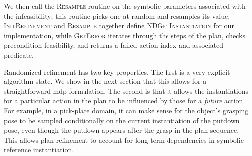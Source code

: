 We then call the \textsc{Resample} routine on the symbolic parameters
associated with the infeasibility; this routine picks one at random and
resamples its value. \textsc{InitRefinement} and \textsc{Resample} together define
\textsc{NDGetInstantiation} for our implementation, while \textsc{GetError} iterates
through the steps of the plan, checks precondition feasibility, and returns
a failed action index and associated predicate.

Randomized refinement has two key properties. The first is a very
explicit algorithm state.  We show in the next section that this
allows for a straightforward {\sc mdp} formulation. The second is that
it allows the instantiations for a particular action in the plan to be
influenced by those for a \emph{future} action. For example, in a
pick-place domain, it can make sense for the object's grasping pose to
be sampled conditionally on the current instantiation of the putdown
pose, even though the putdown appears after the grasp in the plan
sequence. This allows plan refinement to account for long-term
dependencies in symbolic reference instantiation.

